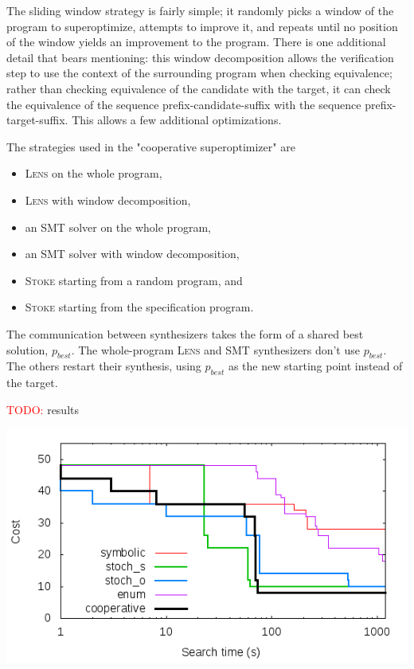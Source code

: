 \documentclass[12pt,twoside]{reedthesis}
\newcommand{\red}[1]{\textcolor{red}{#1}}
\begin{document}
        The sliding window strategy is fairly simple; it randomly picks a window of the program to superoptimize, attempts to improve it, and repeats until no position of the window yields an improvement to the program.
        There is one additional detail that bears mentioning: 
            this window decomposition allows the verification step to use the context of the surrounding program when checking equivalence;
            rather than checking equivalence of the candidate with the target, it can check the equivalence of the sequence prefix-candidate-suffix with the sequence prefix-target-suffix.
        This allows a few additional optimizations.

        The strategies used in the "cooperative superoptimizer" are
        \begin{itemize}
            \item \textsc{Lens} on the whole program,
            \item \textsc{Lens} with window decomposition,
            \item an SMT solver on the whole program,
            \item an SMT solver with window decomposition,
            \item \textsc{Stoke} starting from a random program, and
            \item \textsc{Stoke} starting from the specification program.
        \end{itemize}
        The communication between synthesizers takes the form of a shared best solution, $p_{best}$.
        The whole-program \textsc{Lens} and SMT synthesizers don't use $p_{best}$. The others restart their synthesis, using $p_{best}$ as the new starting point instead of the target.

        \red{TODO:} results

        \includegraphics[scale=0.5]{scaling}
\end{document}
